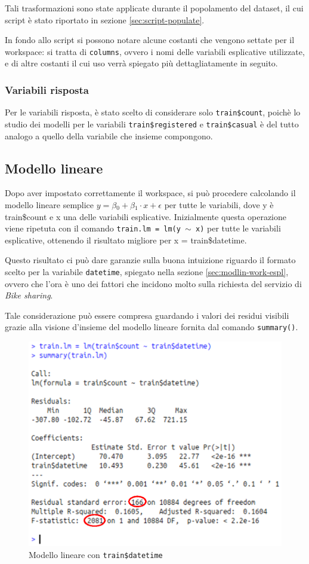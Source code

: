 Tali trasformazioni sono state applicate durante il popolamento del dataset, il
cui script è stato riportato in sezione \ref{sec:script-populate}.

In fondo allo script si possono notare alcune costanti che vengono settate per
il workspace: si tratta di \texttt{columns}, ovvero i nomi delle variabili
esplicative utilizzate, e di altre costanti il cui uso verrà spiegato più
dettagliatamente in seguito.

\subsubsection{Variabili risposta}
Per le variabili risposta, è stato scelto di considerare solo
\texttt{train\$count}, poichè lo studio dei modelli per le variabili
\texttt{train\$registered} e \texttt{train\$casual} è del tutto analogo a
quello della variabile che insieme compongono.

\subsection{Modello lineare}\label{sec:mod-lin}
Dopo aver impostato correttamente il workspace, si può procedere calcolando il
modello lineare semplice $ y = \beta{}_0 + \beta{}_1 \cdot{} x + \epsilon{} $
per tutte le variabili, dove y è train\$count e x una delle variabili
esplicative.
Inizialmente questa operazione viene ripetuta con il comando \texttt{train.lm
= lm(y $ \sim{} $ x)} per tutte le variabili esplicative, ottenendo il
risultato migliore per x = train\$datetime.

Questo risultato ci può dare garanzie sulla buona intuizione riguardo il
formato scelto per la variabile \texttt{datetime}, spiegato nella sezione
\ref{sec:modlin-work-espl}, ovvero che l'ora è uno dei fattori che incidono
molto sulla richiesta del servizio di \emph{Bike sharing}.

Tale considerazione può essere compresa guardando i valori dei residui visibili
grazie alla visione d'insieme del modello lineare fornita dal comando
\texttt{summary()}.

\begin{figure}[H]\label{fig:simplest-linear-model}
  \centering
  \includegraphics[width=.7\columnwidth]{images/simplest-linear-model.eps}
  \caption{Modello lineare con \texttt{train\$datetime}}
\end{figure}


